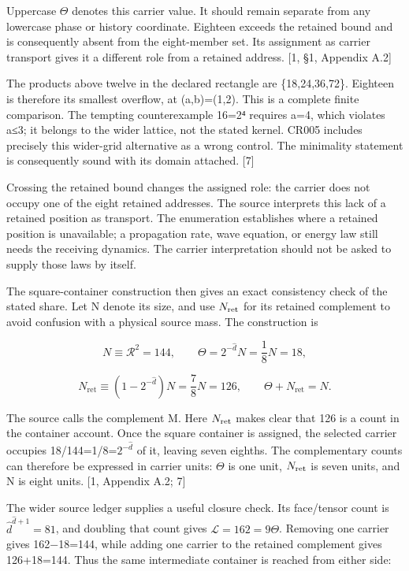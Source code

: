 \documentclass[10pt,twocolumn,letterpaper]{article}
\begin{document}
Uppercase \(\Theta\) denotes this carrier value. It should remain separate from any lowercase phase or history coordinate. Eighteen exceeds the retained bound and is consequently absent from the eight-member set. Its assignment as carrier transport gives it a different role from a retained address. {[}1, §1, Appendix A.2{]}

The products above twelve in the declared rectangle are \{18,24,36,72\}. Eighteen is therefore its smallest overflow, at (a,b)=(1,2). This is a complete finite comparison. The tempting counterexample 16=2⁴ requires a=4, which violates a≤3; it belongs to the wider lattice, not the stated kernel. CR005 includes precisely this wider-grid alternative as a wrong control. The minimality statement is consequently sound with its domain attached. {[}7{]}

Crossing the retained bound changes the assigned role: the carrier does not occupy one of the eight retained addresses. The source interprets this lack of a retained position as transport. The enumeration establishes where a retained position is unavailable; a propagation rate, wave equation, or energy law still needs the receiving dynamics. The carrier interpretation should not be asked to supply those laws by itself.

The square-container construction then gives an exact consistency check of the stated share. Let N denote its size, and use \(N_{\rm ret}\) for its retained complement to avoid confusion with a physical source mass. The construction is

\begin{equation}
N\equiv\mathcal R^2=144,
\qquad
\Theta=2^{-\hat d}N=\frac18N=18,
\end{equation}

\begin{equation}
N_{\mathrm{ret}}\equiv(1-2^{-\hat d})N
=\frac78N=126,
\qquad
\Theta+N_{\mathrm{ret}}=N.
\end{equation}

The source calls the complement M. Here \(N_{\rm ret}\) makes clear that 126 is a count in the container account. Once the square container is assigned, the selected carrier occupies 18/144=1/8=\(2^{-\hat d}\) of it, leaving seven eighths. The complementary counts can therefore be expressed in carrier units: \(\Theta\) is one unit, \(N_{\rm ret}\) is seven units, and N is eight units. {[}1, Appendix A.2; 7{]}

The wider source ledger supplies a useful closure check. Its face/tensor count is \(\hat d^{\hat d+1}=81\), and doubling that count gives \(\mathcal L=162=9\Theta\). Removing one carrier gives 162−18=144, while adding one carrier to the retained complement gives 126+18=144. Thus the same intermediate container is reached from either side:
\end{document}
